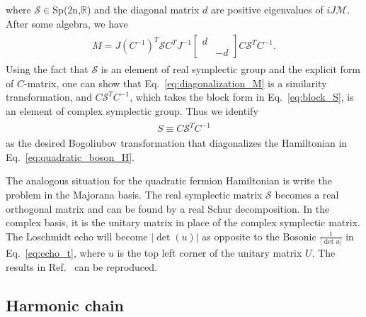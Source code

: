 where $\mathcal{S}\in$Sp(2n,$\mathbb{R}$) and the diagonal matrix $d$ are positive eigenvalues of $iJ\mathcal{M}$. After some algebra, we have
\begin{eqnarray}\begin{aligned}
\label{eq:diagonalization_M}
M=J(C^{-1})^T\mathcal{S}C^TJ^{-1}
\begin{bmatrix}
d\\
&-d
\end{bmatrix}
C\mathcal{S}^TC^{-1}.
\end{aligned}\end{eqnarray}
Using the fact that $\mathcal{S}$ is an element of real symplectic group and the explicit form of $C$-matrix, one can show that Eq.~\eqref{eq:diagonalization_M} is a similarity transformation, and $C\mathcal{S}^TC^{-1}$, which takes the block form in Eq.~\eqref{eq:block_S}, is an element of complex symplectic group. Thus we identify 
\begin{eqnarray*}\begin{aligned}
S\equiv C\mathcal{S}^TC^{-1}
\end{aligned}\end{eqnarray*}
as the desired Bogoliubov transformation that diagonalizes the Hamiltonian in Eq.~\eqref{eq:quadratic_boson_H}. 

The analogous situation for the quadratic fermion Hamiltonian is write the problem in the Majorana basis. The real symplectic matrix $\mathcal{S}$ becomes a real orthogonal matrix and can be found by a real Schur decomposition. In the complex basis, it is the unitary matrix in place of the complex symplectic matrix. The Loschmidt echo will become $|\det ( u )|$ as opposite to the Bosonic $\frac{1}{|\det u|}$ in Eq.~\eqref{eq:echo_t}, where $u$ is the top left corner of the unitary matrix $U$. The results in Ref.~ can be reproduced.  

\subsection{Harmonic chain} 
\label{app_sub:harmonic_chain}

